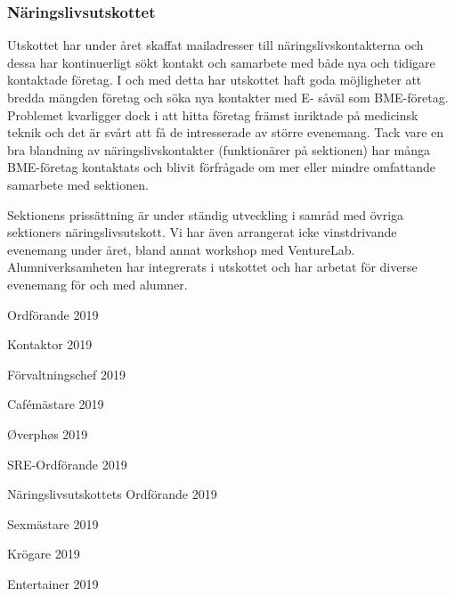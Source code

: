 \documentclass[../_main/handlingar.tex]{subfiles}
\begin{document}
\subsubsection*{Näringslivsutskottet}

Utskottet har under året skaffat mailadresser till näringslivskontakterna och dessa har kontinuerligt sökt kontakt och samarbete med både nya och tidigare kontaktade företag. I och med detta har utskottet haft goda möjligheter att bredda mängden företag och söka nya kontakter med E- såväl som BME-företag. 
Problemet kvarligger dock i att hitta företag främst inriktade på medicinsk teknik och det är svårt att få de intresserade av större evenemang. Tack vare en bra blandning av näringslivskontakter (funktionärer på sektionen) har många BME-företag kontaktats och blivit förfrågade om mer eller mindre omfattande samarbete med sektionen.

Sektionens prissättning är under ständig utveckling i samråd med övriga sektioners näringslivsutskott. Vi har även arrangerat icke vinstdrivande evenemang under året, bland annat workshop med VentureLab. Alumniverksamheten har integrerats i utskottet och har arbetat för diverse evenemang för och med alumner. 


\newpage
\begin{signatures}{10}
    \mvh
    \signature{\ordf}{Ordförande 2019}
    \signature{\sekr}{Kontaktor 2019}
    \signature{\fvc}{Förvaltningschef 2019}
    \signature{\cafem}{Cafémästare 2019}
    \signature{\oph}{Øverphøs 2019}
    \signature{\sreordf}{SRE-Ordförande 2019}
    \signature{\enuordf}{Näringslivsutskottets Ordförande 2019}
    \signature{\sexm}{Sexmästare 2019}
    \signature{\krog}{Krögare 2019}
    \signature{\ent}{Entertainer 2019}
\end{signatures}
\end{document}
